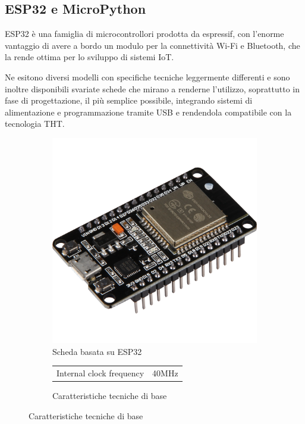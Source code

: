\subsection{ESP32 e MicroPython}
ESP32 è una famiglia di microcontrollori prodotta da espressif, con l'enorme
vantaggio di avere a bordo un modulo per la connettività Wi-Fi e Bluetooth, che
la rende ottima per lo sviluppo di sistemi IoT.

Ne esitono diversi modelli con specifiche tecniche leggermente differenti e sono
inoltre disponibili svariate schede che mirano a renderne l'utilizzo,
soprattutto in fase di progettazione, il più semplice possibile, integrando
sistemi di alimentazione e programmazione tramite USB e rendendola compatibile
con la tecnologia THT.


\begin{figure}[H]%
    \centering
    \begin{subfigure}{0.49\textwidth}
        \centering
        \includegraphics[scale=0.4]{introduzione/esp32.png}%
        \caption{Scheda basata su ESP32}
    \end{subfigure}
    \begin{subfigure}{0.49\textwidth}
        \centering
        \caption{Caratteristiche tecniche di base}
        \begin{tabular}{|c|c|}
            \hline
            Internal clock frequency & 40MHz        \\

\end{tabular}
\end{subfigure}
\end{figure}
